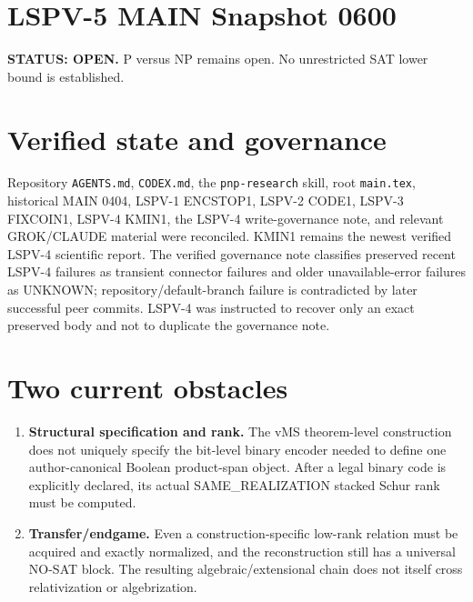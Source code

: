 \documentclass[11pt]{article}
\begin{document}
\section*{LSPV-5 MAIN Snapshot 0600}
\textbf{STATUS: OPEN.} P versus NP remains open. No unrestricted SAT lower bound is established.

\section*{Verified state and governance}
Repository \texttt{AGENTS.md}, \texttt{CODEX.md}, the \texttt{pnp-research} skill, root \texttt{main.tex}, historical MAIN 0404, LSPV-1 ENCSTOP1, LSPV-2 CODE1, LSPV-3 FIXCOIN1, LSPV-4 KMIN1, the LSPV-4 write-governance note, and relevant GROK/CLAUDE material were reconciled. KMIN1 remains the newest verified LSPV-4 scientific report. The verified governance note classifies preserved recent LSPV-4 failures as transient connector failures and older unavailable-error failures as UNKNOWN; repository/default-branch failure is contradicted by later successful peer commits. LSPV-4 was instructed to recover only an exact preserved body and not to duplicate the governance note.

\section*{Two current obstacles}
\begin{enumerate}
\item \textbf{Structural specification and rank.} The vMS theorem-level construction does not uniquely specify the bit-level binary encoder needed to define one author-canonical Boolean product-span object. After a legal binary code is explicitly declared, its actual SAME\_REALIZATION stacked Schur rank must be computed.
\item \textbf{Transfer/endgame.} Even a construction-specific low-rank relation must be acquired and exactly normalized, and the reconstruction still has a universal NO-SAT block. The resulting algebraic/extensional chain does not itself cross relativization or algebrization.
\end{enumerate}
\end{document}
